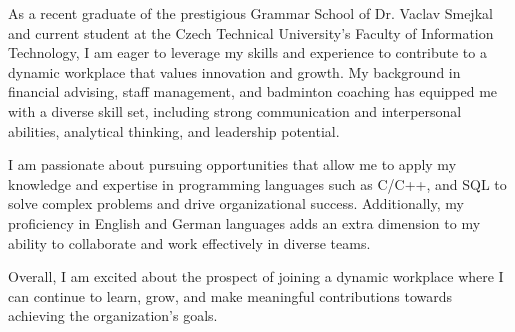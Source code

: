 \documentclass[9pt]{developercv} %
\begin{document}
\vspace{0.5cm}



\begin{minipage}[t]{0.6\textwidth} %
	\vspace{-\baselineskip} %
	
	As a recent graduate of the prestigious Grammar School of Dr. Vaclav Smejkal and current student at the Czech Technical University's Faculty of Information Technology, 
	I am eager to leverage my skills and experience to contribute to a dynamic workplace that values innovation and growth. My background in financial advising, staff management,
	 and badminton coaching has equipped me with a diverse skill set, including strong communication and interpersonal abilities, analytical thinking, and leadership potential.

	I am passionate about pursuing opportunities that allow me to apply my knowledge and expertise in programming languages such as C/C++, and SQL
	 to solve complex problems and drive organizational success. Additionally, my proficiency in English and German languages adds an extra dimension to my ability to collaborate and work effectively in
	  diverse teams.

	Overall, I am excited about the prospect of joining a dynamic workplace where I can continue to learn, grow, and make meaningful contributions towards achieving the organization's goals.\\
\end{minipage}
\hfill %
\begin{minipage}[t]{0.4\textwidth} %
	\vspace{0.5cm}
	\vspace{0.5cm}
	\vspace{-\baselineskip} %
	\begin{barchart}{5.5}
	\end{barchart}
\end{minipage}
\end{document}
